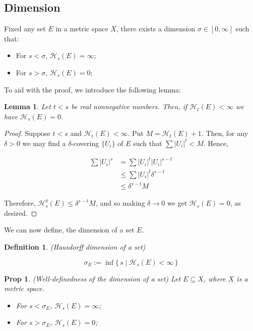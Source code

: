 \documentclass[11pt]{amsart}
\newcommand{\HH}{\mathcal{H}}
\newtheorem{lemma}{Lemma}
\newtheorem{prop}{Prop}
\newtheorem{definition}{Definition}
\begin{document}
\subsection{Dimension}

Fixed any set $E$ in a metric space $X$, there exists a dimension $\sigma \in \left[0, \infty\right]$ such that:

\begin{itemize}
\item For $s < \sigma$, $\HH_s(E) = \infty$;

\item For $s > \sigma$, $\HH_s(E) = 0$;
\end{itemize}

To aid with the proof, we introduce the following lemma:

\begin{lemma}\label{helperdimension}
Let $t < s$ be real nonnegative numbers. Then, if $\HH_t(E) < \infty$ we have $\HH_s(E) = 0$.
\end{lemma}

\begin{proof}
Suppose $t < s$ and $\HH_t(E) < \infty$. Put $M = \HH_t(E) + 1$. Then, for any $\delta > 0$ we may find a $\delta$-covering $\{U_i\}$ of $E$ such that $\sum \lvert U_i \rvert^t < M$. Hence, 

\begin{align*}
\sum \lvert U_i \rvert^s &= \sum \lvert U_i \rvert^t \lvert U_i \rvert^{s - t}\\
&\leq \sum \lvert U_i \rvert^t \delta^{s-t}\\
&\leq \delta^{s-t} M
\end{align*}

Therefore, $\HH_s^\delta(E) \leq \delta^{s-t} M$, and so making $\delta \to 0$ we get $\HH_s(E) = 0$, as desired.
\end{proof}

We can now define, the dimension of a set $E$.

\begin{definition} (Hausdorff dimension of a set)

\[\sigma_E := \inf \{\, s \mid \HH_s(E) < \infty \,\}\]
\end{definition}

\begin{prop}
(Well-definedness of the dimension of a set) Let $E \subseteq X$, where $X$ is a metric space.

\begin{itemize}
\item For $s < \sigma_E$, $\HH_s(E) = \infty$;

\item For $s > \sigma_E$, $\HH_s(E) = 0$;
\end{itemize}

\end{prop}
\end{document}
